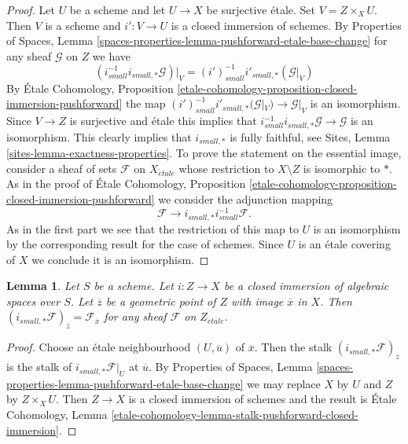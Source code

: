 \documentclass{stacks-project}
\theoremstyle{plain}
\newtheorem{lemma}[subsection]{Lemma}
\theoremstyle{definition}
\theoremstyle{remark}
\numberwithin{equation}{subsection}
\def\etale{{\acute{e}tale}}
\begin{document}
\begin{proof}
Let $U$ be a scheme and let $U \to X$ be surjective \'etale.
Set $V = Z \times_X U$. Then $V$ is a scheme and $i' : V \to U$ is
a closed immersion of schemes. By
Properties of Spaces,
Lemma \ref{spaces-properties-lemma-pushforward-etale-base-change}
for any sheaf $\mathcal{G}$ on $Z$ we have
$$
(i_{small}^{-1}i_{small, *}\mathcal{G})|_V =
(i')_{small}^{-1}i'_{small, *}(\mathcal{G}|_V)
$$
By
\'Etale Cohomology, Proposition
\ref{etale-cohomology-proposition-closed-immersion-pushforward}
the map
$(i')_{small}^{-1}i'_{small, *}(\mathcal{G}|_V) \to \mathcal{G}|_V$
is an isomorphism. Since $V \to Z$ is surjective and \'etale this implies
that $i_{small}^{-1}i_{small, *}\mathcal{G} \to \mathcal{G}$ is an
isomorphism. This clearly implies that $i_{small, *}$ is fully faithful, see
Sites, Lemma \ref{sites-lemma-exactness-properties}.
To prove the statement on the essential image, consider a sheaf of sets
$\mathcal{F}$ on $X_\etale$ whose restriction to $X \setminus Z$ is
isomorphic to $*$. As in the proof of
\'Etale Cohomology, Proposition
\ref{etale-cohomology-proposition-closed-immersion-pushforward}
we consider the adjunction mapping
$$
\mathcal{F} \longrightarrow i_{small, *}i_{small}^{-1}\mathcal{F}.
$$
As in the first part we see that the restriction of this map to
$U$ is an isomorphism by the corresponding result for the case of
schemes. Since $U$ is an \'etale covering of $X$ we
conclude it is an isomorphism.
\end{proof}

\begin{lemma}
\label{lemma-stalk-push-closed}
Let $S$ be a scheme. Let $i : Z \to X$ be a closed immersion of algebraic
spaces over $S$. Let $\overline{z}$ be a geometric point of $Z$ with
image $\overline{x}$ in $X$. Then
$(i_{small, *}\mathcal{F})_{\overline{z}} = \mathcal{F}_{\overline{x}}$
for any sheaf $\mathcal{F}$ on $Z_\etale$.
\end{lemma}

\begin{proof}
Choose an \'etale neighbourhood $(U, \overline{u})$ of $\overline{x}$.
Then the stalk $(i_{small, *}\mathcal{F})_{\overline{z}}$
is the stalk of $i_{small, *}\mathcal{F}|_U$ at $\overline{u}$.
By Properties of Spaces,
Lemma \ref{spaces-properties-lemma-pushforward-etale-base-change}
we may replace $X$ by $U$ and $Z$ by $Z \times_X U$.
Then $Z \to X$ is a closed immersion of schemes and the result is
\'Etale Cohomology, Lemma
\ref{etale-cohomology-lemma-stalk-pushforward-closed-immersion}.
\end{proof}
\end{document}
